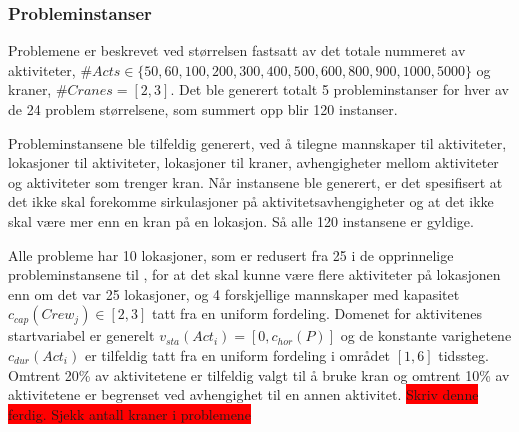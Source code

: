 \subsubsection{Probleminstanser}
Problemene er beskrevet ved størrelsen fastsatt av det totale nummeret av aktiviteter, $ \#Acts \in \{ 50,60, 100, 200, 300, 400, 500, 600, 800, 900, 1000, 5000 \} $ og kraner, $ \#Cranes = [2,3] $. Det ble generert totalt 5 probleminstanser for hver av de 24 problem størrelsene, som summert opp blir 120 instanser.

Probleminstansene ble tilfeldig generert, ved å tilegne mannskaper til aktiviteter, lokasjoner til aktiviteter, lokasjoner til kraner, avhengigheter mellom aktiviteter og aktiviteter som trenger kran. Når instansene ble generert, er det spesifisert at det ikke skal forekomme sirkulasjoner på aktivitetsavhengigheter og at det ikke skal være mer enn en kran på en lokasjon. Så alle 120 instansene er gyldige.

Alle probleme har 10 lokasjoner, som er redusert fra 25 i de opprinnelige probleminstansene til \bht, for at det skal kunne være flere aktiviteter på lokasjonen enn om det var 25 lokasjoner, og 4 forskjellige mannskaper med kapasitet $ c_{cap}(Crew_{j}) \in [2,3] $ tatt fra en uniform fordeling. Domenet for aktivitenes startvariabel er generelt $ v_{sta}(Act_{i}) = [0,c_{hor}(P)] $ og de konstante varighetene $ c_{dur}(Act_{i}) $ er tilfeldig tatt fra en uniform fordeling i området $ [1,6] $ tidssteg. Omtrent 20\% av aktivitetene er tilfeldig valgt til å bruke kran og omtrent 10\% av aktivitetene er begrenset ved avhengighet til en annen aktivitet.
\colorbox{red}{Skriv denne ferdig. Sjekk antall kraner i problemene}